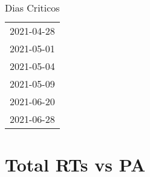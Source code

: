 \documentclass[
]{article}
\author{}
\date{\vspace{-2.5em}}
\begin{document}
\begin{table}[H]
    \centering
    \caption{Dias Criticos}
    \label{tab:dias_criticos}
    \begin{tabular}{c}
        \toprule
          2021-04-28 \\
          2021-05-01 \\
          2021-05-04 \\
          2021-05-09 \\
          2021-06-20 \\
          2021-06-28 \\
        \bottomrule
    \end{tabular}
\end{table}

\tableofcontents
\newpage
\section{Total RTs vs PA}
\end{document}
